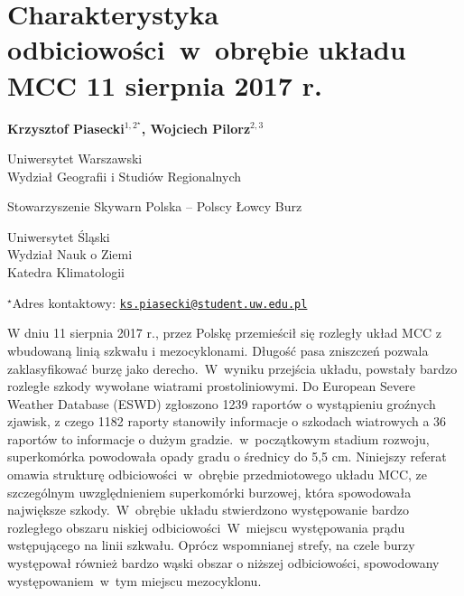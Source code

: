 \documentclass[\main/boa.tex]{subfiles}
\begin{document}
\section{Charakterystyka odbiciowości~w~obrębie układu MCC 11 sierpnia 2017 r.}

\begin{center}
  {\bf {} Krzysztof Piasecki$^{1,2^\star}$,  Wojciech Pilorz$^{2,3}$}
\end{center}

\vskip 0.3cm

\begin{affiliations}
\begin{enumerate}
\begin{minipage}{0.915\textwidth}
\centering
\item Uniwersytet Warszawski \\ Wydział Geografii i Studiów Regionalnych
\item Stowarzyszenie Skywarn Polska – Polscy Łowcy Burz\\[-2pt]
\item Uniwersytet Śląski\\Wydział Nauk o Ziemi\\ Katedra Klimatologii\\[-2pt]
\end{minipage}
\end{enumerate}
$^\star$Adres kontaktowy: \href{mailto:ks.piasecki@student.uw.edu.pl}{\nolinkurl{ks.piasecki@student.uw.edu.pl}}\\
\end{affiliations}

\vskip 0.5cm


\vskip 0.5cm

W dniu 11 sierpnia 2017 r., przez Polskę przemieścił się rozległy układ MCC z wbudowaną linią szkwału i mezocyklonami. Długość pasa zniszczeń pozwala zaklasyfikować burzę jako derecho.~W~wyniku przejścia układu, powstały bardzo rozległe szkody wywołane wiatrami prostoliniowymi. Do European Severe Weather Database (ESWD) zgłoszono 1239 raportów o wystąpieniu groźnych zjawisk, z czego 1182 raporty stanowiły informacje o szkodach wiatrowych a 36 raportów to informacje o dużym gradzie.~w~początkowym stadium rozwoju, superkomórka powodowała opady gradu o średnicy do 5,5 cm. Niniejszy referat omawia strukturę odbiciowości~w~obrębie przedmiotowego układu MCC, ze szczególnym uwzględnieniem superkomórki burzowej, która spowodowała największe szkody.~W~obrębie układu stwierdzono występowanie bardzo rozległego obszaru niskiej odbiciowości~W~miejscu występowania prądu wstępującego na linii szkwału. Oprócz wspomnianej strefy, na czele burzy występował również bardzo wąski obszar o niższej odbiciowości, spowodowany występowaniem~w~tym miejscu mezocyklonu.
\end{document}
